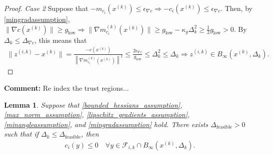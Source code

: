 \documentclass{article}
\newenvironment{comment}
  {\par\medskip
   \color{red}%
   \begin{framed}
   \textbf{Comment: }\ignorespaces}
 {\end{framed}
  \medskip}
\newtheorem{lemma}[theorem]{Lemma}
\theoremstyle{case}
\numberwithin{theorem}{subsection}
\newcommand{\dfeas}{{\Delta_{\textrm{feasible}}}}
\newcommand{\dk}{\Delta_k}
\newcommand{\fik}{{\mathcal F_{i, k}}}
\newcommand{\gmcik}{{\nabla m_{c_i}^{(k)}\left(\xk\right)}}
\newcommand{\mingraddelta}{{\Delta_{\nabla c}}}
\newcommand{\mingradepsilon}{{\epsilon_{\nabla c}}}
\newcommand{\mingrad}{{ g_{\textrm{low}} }}
\newcommand{\tr}{{ B_{\infty}\left(\xk, \dk\right) }}
\newcommand{\xk}{{x^{(k)}}}
\newcommand{\zik}{{z^{(i, k)}}}
\begin{document}
\begin{proof}
\emph{Case 2}
Suppose that $-m_{c_i}(\xk) \le \mingradepsilon \Longrightarrow -c_i(\xk) \le \mingradepsilon$.
Then, by \cref{mingradassumption}, $\|\nabla c(\xk) \| \ge \mingrad \Longrightarrow \|\gmcik\| \ge \mingrad - \kappa_g \dk^2 \ge \frac 1 2 \mingrad > 0$.
By $\dk \le \mingraddelta$, this means that 
\begin{align*}
\|\zik-\xk\| = \frac{-c(\xk)}{\left\|\gmcik\right\|^2} \le \frac{2\mingradepsilon}{\mingrad}\le \dk^2 \le \dk \Longrightarrow \zik \in \tr.
\end{align*}
\end{proof}


\begin{comment}
Re index the trust regions...
\end{comment}


\begin{lemma}
\label{each_constraints_cone_is_feasible}
Suppose that 
\cref{bounded_hessians_assumption},
\cref{max_norm_assumption},
\cref{lipschitz_gradients_assumption},
\cref{minangleassumption},
and \cref{mingradassumption} hold.
There exists $\dfeas > 0$ such that
if $\dk \le \dfeas$, then
\begin{align*}
c_i(y) \le 0 \quad \forall y \in \fik \cap \tr.
\end{align*}
\end{lemma}
\end{document}
